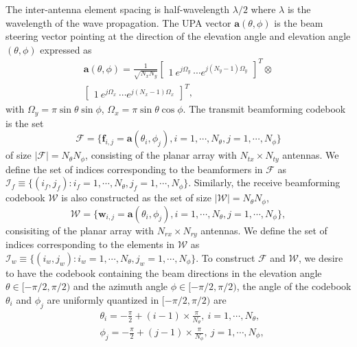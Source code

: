 \documentclass[12pt, draftcls, onecolumn]{IEEEtran}
\theoremstyle{plain}
\theoremstyle{definition}
\theoremstyle{remark}
\begin{document}
The inter-antenna element spacing is half-wavelength $\lambda/2$ where $\lambda$ is the wavelength of the wave propagation.
The UPA vector $\mathbf{a}(\theta,\phi)$ is the beam steering vector pointing at the direction of the elevation angle and elevation angle $(\theta,\phi)$ expressed as
\begin{equation}
\label{atp}
\begin{aligned}
    \mathbf{a}(\theta,\phi)=\frac{1}{\sqrt{N_xN_y}}
    \begin{bmatrix}
           1\ e^{j\Omega_y}\ \cdots     e^{j({N}_y-1)\Omega_y}
    \end{bmatrix}^T
    \otimes\\
    \begin{bmatrix}
           1\ e^{j\Omega_x}\ \cdots e^{j({N}_x-1)\Omega_x}
    \end{bmatrix}^T,
\end{aligned}
\end{equation}
with $\Omega_y{=}{\pi}\sin{\theta}\sin{\phi}$, $\Omega_x{=}{\pi}\sin{\theta}\cos{\phi}$. 
The transmit beamforming codebook is the set  
$$\mathcal{F}{=}\{\mathbf f_{i,j}=\mathbf{a}(\theta_i,\phi_j),i=1,\cdots,N_{\theta},j=1,\cdots,N_{\phi}\}$$
of size $\vert \mathcal{F}\vert = N_\theta N_\phi$, consisting of the planar array with $N_{tx} \times N_{ty}$ antennas.
We define the set of indices corresponding to the beamformers in $\mathcal{F}$ as
$\mathcal I_f\equiv\{(i_f,j_f):i_f =1,\cdots,N_{\theta},j_f =1,\cdots,N_{\phi}\}.$
Similarly, the receive beamforming codebook $\mathcal{W}$ is also constructed  as the set of size $\vert\mathcal{W}\vert = N_\theta N_\phi$,
$$\mathcal{W}{=}\{\mathbf w_{i,j}=\mathbf{a}(\theta_i,\phi_j),i=1,\cdots,N_{\theta},j=1,\cdots,N_{\phi}\},$$
consisiting of the planar array with $N_{rx} \times N_{ry}$ antennas.
We define the set of indices corresponding to the elements in $\mathcal{W}$ as $\mathcal I_w\equiv\{(i_w,j_w):i_w =1,\cdots,N_{\theta},j_w =1,\cdots,N_{\phi}\}.$
To construct $\mathcal{F}$ and $\mathcal{W}$,
we desire to have the codebook containing the beam directions in the elevation angle $\theta\in[-\pi/2,\pi/2)$ and the azimuth angle $\phi\in[-\pi/2,\pi/2)$,
the angle of the codebook $\theta_i$ and $\phi_j$ are uniformly quantized in $[-\pi/2,\pi/2)$ are
\begin{align}
 &   \theta_i = -\frac{\pi}{2}+(i-1)\times\frac{\pi}{N_{\theta}}, \ i =1,\cdots,N_{\theta},\\
  &  \phi_j = -\frac{\pi}{2}+(j-1)\times\frac{\pi}{N_{\phi}}, \ j =1,\cdots,N_{\phi},
\end{align}
\end{document}
